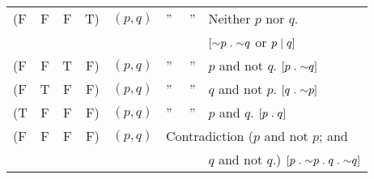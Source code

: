 {\begin{scriptsize}
\begin{tabular}{@{}l@{} @{}c@{} @{}c@{} @{}r@{} @{\thinspace}l@{~} @{~}l@{} @{~}l@{}}
\vspace*{0pt}(F&F&F&T) & $(p,q)$ & \phantom{i}'' \quad~~'' &Neither $p$ nor $q$. \\
\vspace*{0pt}  & & &   &         &                            & \qquad$[\mathord{\sim} p \mathrel{.} \mathord{\sim} q$ or $p \mathrel{\vert} q]$\\
\vspace*{0pt}(F&F&T&F) & $(p,q)$ & \phantom{i}'' \quad~~'' &$p$ and not $q$. \quad$[p \mathrel{.} \mathord{\sim} q]$ \\
\vspace*{0pt}(F&T&F&F) & $(p,q)$ & \phantom{i}'' \quad~~'' &$q$ and not $p$. \quad$[q \mathrel{.} \mathord{\sim} p]$ \\
\vspace*{0pt}(T&F&F&F) & $(p,q)$ & \phantom{i}'' \quad~~'' &$p$ and $q$. \quad$[p \mathrel{.} q]$ \\
\vspace*{0pt}(F&F&F&F) & $(p,q)$ &\multicolumn{2}{l}{\hspace*{-7pt}Contradiction ($p$ and not $p$; and} \\
\vspace*{0pt}  & & &   &         &                            & $q$ and not $q$.) \quad$[p \mathrel{.} \mathord{\sim} p \mathrel{.} q \mathrel{.} \mathord{\sim} q]$ \\
\end{tabular}\end{scriptsize}}
%

